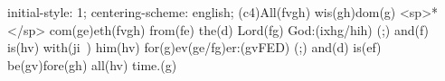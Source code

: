initial-style: 1;
centering-scheme: english;
(c4)All(fvgh) wis(gh)dom(g) <sp>*</sp> com(ge)eth(fvgh) from(fe) the(d) Lord(fg) God:(ixhg/hih) (;) and(f) is(hv) with(ji~) him(hv) for(g)ev(ge/fg)er:(gvFED) (;) and(d) is(ef) be(gv)fore(gh) all(hv) time.(g)
